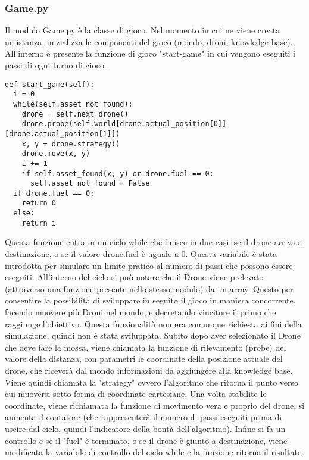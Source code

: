 \subsubsection{Game.py}
Il modulo Game.py è la classe di gioco. Nel momento in cui ne viene creata un'istanza, inizializza le componenti del gioco (mondo, droni, knowledge base). All'interno è presente la funzione di gioco "start-game" in cui vengono eseguiti i passi di ogni turno di gioco. 
\begin{verbatim}
def start_game(self):
  i = 0
  while(self.asset_not_found):
    drone = self.next_drone()
    drone.probe(self.world[drone.actual_position[0]][drone.actual_position[1]])
    x, y = drone.strategy()
    drone.move(x, y)
    i += 1
    if self.asset_found(x, y) or drone.fuel == 0:
      self.asset_not_found = False
  if drone.fuel == 0:
    return 0
  else:
    return i
\end{verbatim}
Questa funzione entra in un ciclo while che finisce in due casi: se il drone arriva a destinazione, o se il valore drone.fuel è uguale a 0. Questa variabile è stata introdotta per simulare un limite pratico al numero di passi che possono essere eseguiti. All'interno del ciclo si può notare che il Drone viene prelevato (attraverso una funzione presente nello stesso modulo) da un array. Questo per consentire la possibilità di sviluppare in seguito il gioco in maniera concorrente, facendo muovere più Droni nel mondo, e decretando vincitore il primo che raggiunge l'obiettivo. Questa funzionalità non era comunque richiesta ai fini della simulazione, quindi non è stata sviluppata. Subito dopo aver selezionato il Drone che deve fare la mossa, viene chiamata la funzione di rilevamento (probe) del valore della distanza, con parametri le coordinate della posizione attuale del drone, che riceverà dal mondo informazioni da aggiungere alla knowledge base. Viene quindi chiamata la "strategy" ovvero l'algoritmo che ritorna il punto verso cui muoversi sotto forma di coordinate cartesiane. Una volta stabilite le coordinate, viene richiamata la funzione di movimento vera e proprio del drone, si aumenta il contatore (che rappresenterà il numero di passi eseguiti prima di uscire dal ciclo, quindi l'indicatore della bontà dell'algoritmo). Infine si fa un controllo e se il "fuel" è terminato, o se il drone è giunto a destinazione, viene modificata la variabile di controllo del ciclo while e la funzione ritorna il risultato.

